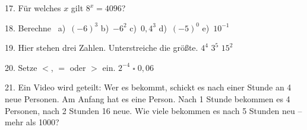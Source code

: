 \documentclass[11pt]{article}
\begin{document}
\begin{pfaufg}{}{17.}{}
Für welches $x$ gilt $8^x = 4096$?
\end{pfaufg}

\begin{pfaufg}{}{18.}{}
Berechne \ a)~$(-6)^3$ \qquad b)~$-6^2$ \qquad c)~$0{,}4^3$ \qquad d)~$(-5)^0$ \qquad e)~$10^{-1}$
\end{pfaufg}

\begin{pfaufg}{}{19.}{}
Hier stehen drei Zahlen. Unterstreiche die größte. \quad $4^4$ \qquad $3^5$ \qquad $15^2$
\end{pfaufg}

\begin{pfaufg}{}{20.}{}
Setze $<$, $=$ oder $>$ ein. \qquad $2^{-4} \;\square\; 0{,}06$
\end{pfaufg}

\begin{pfaufg}{}{21.}{}
Ein Video wird geteilt: Wer es bekommt, schickt es nach einer Stunde an 4 neue Personen. Am Anfang hat es eine Person. Nach 1 Stunde bekommen es 4 Personen, nach 2 Stunden 16 neue. Wie viele bekommen es nach 5 Stunden neu – mehr als 1000?
\end{pfaufg}

\par\vfill{}
\end{document}
